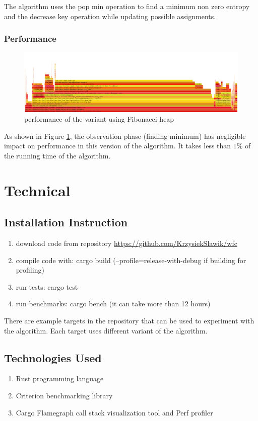 \documentclass[shortabstract, english, inz]{iithesis}
\begin{document}
The algorithm uses the pop min operation to find a minimum non zero entropy and the decrease key operation while updating possible assignments.

\subsection{Performance}
\begin{figure}[H]
\centering
\includegraphics[width=1\textwidth, angle=0]{images/fibheap_flamegraph.png}
\caption{performance of the variant using Fibonacci heap}
\label{fig:fibheap_flamegraph}
\end{figure}
As shown in Figure \ref{fig:fibheap_flamegraph}, the observation phase (finding minimum) has negligible impact on performance in this version of the algorithm. It takes less than \(1\%\)  of the running time of the algorithm.

\chapter{Technical}
\label{chapter5}
\section{Installation Instruction}
\begin{enumerate}
    \item download code from repository \url{https://github.com/KrzysiekSlawik/wfc}
    \item compile code with: cargo build (--profile=release-with-debug if building for profiling)
    \item run tests: cargo test
    \item run benchmarks: cargo bench (it can take more than 12 hours)
\end{enumerate}

There are example targets in the repository that can be used to experiment with the algorithm. Each target uses different variant of the algorithm.

\section{Technologies Used}
\begin{enumerate}
    \item Rust programming language
    \item Criterion benchmarking library
    \item Cargo Flamegraph call stack visualization tool and Perf profiler
\end{enumerate}
\end{document}
